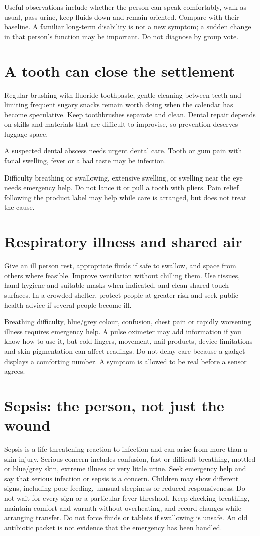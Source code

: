 \documentclass[10pt,openright]{book}
\begin{document}
Useful observations include whether the person can speak comfortably, walk as usual, pass urine, keep fluids down and remain oriented. Compare with their baseline. A familiar long-term disability is not a new symptom; a sudden change in that person's function may be important. Do not diagnose by group vote.

\section*{A tooth can close the settlement}
Regular brushing with fluoride toothpaste, gentle cleaning between teeth and limiting frequent sugary snacks remain worth doing when the calendar has become speculative. Keep toothbrushes separate and clean. Dental repair depends on skills and materials that are difficult to improvise, so prevention deserves luggage space.

A suspected dental abscess needs urgent dental care. Tooth or gum pain with facial swelling, fever or a bad taste may be infection.

Difficulty breathing or swallowing, extensive swelling, or swelling near the eye needs emergency help. Do not lance it or pull a tooth with pliers. Pain relief following the product label may help while care is arranged, but does not treat the cause.

\section*{Respiratory illness and shared air}
Give an ill person rest, appropriate fluids if safe to swallow, and space from others where feasible. Improve ventilation without chilling them. Use tissues, hand hygiene and suitable masks when indicated, and clean shared touch surfaces. In a crowded shelter, protect people at greater risk and seek public-health advice if several people become ill.

Breathing difficulty, blue/grey colour, confusion, chest pain or rapidly worsening illness requires emergency help. A pulse oximeter may add information if you know how to use it, but cold fingers, movement, nail products, device limitations and skin pigmentation can affect readings. Do not delay care because a gadget displays a comforting number. A symptom is allowed to be real before a sensor agrees.

\section*{Sepsis: the person, not just the wound}
Sepsis is a life-threatening reaction to infection and can arise from more than a skin injury. Serious concern includes confusion, fast or difficult breathing, mottled or blue/grey skin, extreme illness or very little urine. Seek emergency help and say that serious infection or sepsis is a concern. Children may show different signs, including poor feeding, unusual sleepiness or reduced responsiveness. Do not wait for every sign or a particular fever threshold. Keep checking breathing, maintain comfort and warmth without overheating, and record changes while arranging transfer. Do not force fluids or tablets if swallowing is unsafe. An old antibiotic packet is not evidence that the emergency has been handled.
\end{document}
